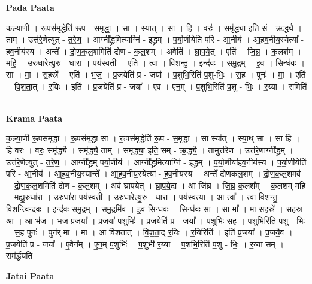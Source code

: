 \documentclass[17pt]{extarticle}
\begin{document}
\textbf{Pada Paata} \newline

क॒ल्या॒णी । रू॒पस॑मृ॒द्धेति॑ रू॒प - स॒मृ॒द्धा॒ । सा । स्या॒त् । सा । हि । वरः॑ । समृ॑द्ध्या॒ इति॒ सं - ऋ॒द्ध्यै॒ । ताम् । उत्त॑रे॒णेत्युत् - त॒रे॒ण॒ । आग्नी᳚द्ध्र॒मित्याग्नि॑ - इ॒द्ध्र॒म् । प॒र्या॒णीयेति॑ परि - आ॒नीय॑ । आ॒ह॒व॒नीय॒स्येत्या᳚ - ह॒व॒नीय॑स्य । अन्ते᳚ । द्रो॒ण॒क॒ल॒शमिति॑ द्रोण - क॒ल॒शम् । अवेति॑ । घ्रा॒प॒ये॒त् । एति॑ । जि॒घ्र॒ । क॒लश᳚म् । म॒हि॒ । उ॒रुधा॒रेत्यु॒रु - धा॒रा॒ । पय॑स्वती । एति॑ । त्वा॒ । वि॒श॒न्तु॒ । इन्द॑वः । स॒मु॒द्रम् । इ॒व॒ । सिन्ध॑वः । सा । मा॒ । स॒हस्रे᳚ । एति॑ । भ॒ज॒ । प्र॒जयेति॑ प्र - जया᳚ । प॒शुभि॒रिति॑ प॒शु-भिः॒ । स॒ह । पुनः॑ । मा॒ । एति॑ । वि॒श॒ता॒त् । र॒यिः । इति॑ । प्र॒जयेति॑ प्र - जया᳚ । ए॒व । ए॒न॒म् । प॒शुभि॒रिति॑ प॒शु - भिः॒ । र॒य्या । समिति॑ ।  \newline


\textbf{Krama Paata} \newline

क॒ल्या॒णी रू॒पस॑मृद्धा । रू॒पस॑मृद्धा॒ सा । रू॒पस॑मृ॒द्धेति॑ रू॒प - स॒मृ॒द्धा॒ । सा स्या᳚त् । स्या॒थ् सा । सा हि । हि वरः॑ । वरः॒ समृ॑द्ध्यै । समृ॑द्ध्यै॒ ताम् । समृ॑द्ध्या॒ इति॒ सम् - ऋ॒द्ध्यै॒ । तामुत्त॑रेण । उत्त॑रे॒णाग्नी᳚द्ध्रम् । उत्त॑रे॒णेत्युत् - त॒रे॒ण॒ । आग्नी᳚द्ध्रम् पर्या॒णीय॑ । आग्नी᳚द्ध्र॒मित्याग्नि॑ - इ॒द्ध्र॒म् । प॒र्या॒णीया॑हव॒नीय॑स्य । प॒र्या॒णीयेति॑ परि - आ॒नीय॑ । आ॒ह॒व॒नीय॒स्यान्ते᳚ । आ॒ह॒व॒नीय॒स्येत्या᳚ - ह॒व॒नीय॑स्य । अन्ते᳚ द्रोणकल॒शम् । द्रो॒ण॒क॒ल॒शमव॑ । द्रो॒ण॒क॒ल॒शमिति॑ द्रोण - क॒ल॒शम् । अव॑ घ्रापयेत् । घ्रा॒प॒ये॒दा । आ जि॑घ्र । जि॒घ्र॒ क॒लश᳚म् । क॒लश॑म् महि । म॒ह्यु॒रुधा॑रा । उ॒रुधा॑रा॒ पय॑स्वती । उ॒रुधा॒रेत्यु॒रु - धा॒रा॒ । पय॑स्व॒त्या । आ त्वा᳚ । त्वा॒ वि॒श॒न्तु॒ । वि॒श॒न्त्विन्द॑वः । इन्द॑वः समु॒द्रम् । स॒मु॒द्रमि॑व । इ॒व॒ सिन्ध॑वः । सिन्ध॑वः॒ सा । सा मा᳚ । मा॒ स॒हस्रे᳚ । स॒हस्र॒ आ । आ भ॑ज । भ॒ज॒ प्र॒जया᳚ । प्र॒जया॑ प॒शुभिः॑ । प्र॒जयेति॑ प्र - जया᳚ । प॒शुभिः॑ स॒ह । प॒शुभि॒रिति॑ प॒शु - भिः॒ । स॒ह पुनः॑ । पुन॑र् मा । मा । आ वि॑शतात् । वि॒श॒ता॒द् र॒यिः । र॒यिरिति॑ । इति॑ प्र॒जया᳚ । प्र॒जयै॒व । प्र॒जयेति॑ प्र - जया᳚ । ए॒वैन᳚म् । ए॒न॒म् प॒शुभिः॑ । प॒शुभी॑ र॒य्या । प॒शभि॒रिति॑ प॒शु - भिः॒ । र॒य्या सम् । सम॑र्द्धयति \newline

\textbf{Jatai Paata} \newline
\end{document}
